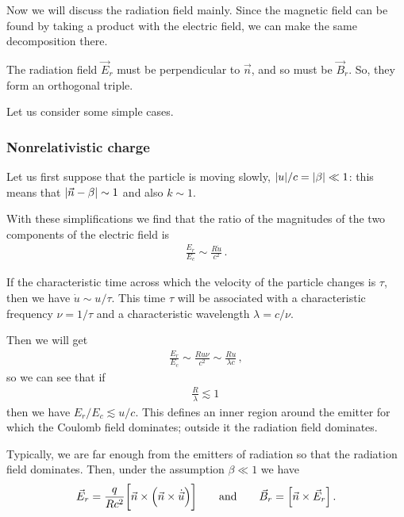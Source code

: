 \documentclass[main.tex]{subfiles}
\begin{document}
Now we will discuss the radiation field mainly. Since the magnetic field can be found by taking a product with the electric field, we can make the same decomposition there.

The radiation field \(\vec{E}_r\) must be perpendicular to \(\vec{n}\), and so must be \(\vec{B}_r\). So, they form an orthogonal triple. 

Let us consider some simple cases. 

\subsubsection{Nonrelativistic charge}

Let us first suppose that the particle is moving slowly, \(\abs{u}/ c = \abs{\beta } \ll 1 \): this means that \(\abs{\vec{n} - \beta } \sim 1\) and also \(k \sim 1\). 

With these simplifications we find that the ratio of the magnitudes of the two components of the electric field is  
%
\begin{align}
\frac{E_r}{E_c} \sim \frac{R \dot{u}}{c^2}
\,.
\end{align}

If the characteristic time across which the velocity of the particle changes is \(\tau \), then we have \(\dot{u} \sim u / \tau\). 
This time \(\tau \) will be associated with a characteristic frequency \(\nu = 1 / \tau \) and a characteristic wavelength \(\lambda = c / \nu \). 

Then we will get 
%
\begin{align}
\frac{E_r}{E_c} \sim \frac{R u \nu }{c^2} \sim \frac{R u}{\lambda c}
\,,
\end{align}
%
so we can see that if 
%
\begin{align}
\frac{R}{\lambda } \lesssim 1
\,
\end{align}
%
then we have \(E_r / E_c \lesssim u /c\). This defines an inner region around the emitter for which the Coulomb field dominates; outside it the radiation field dominates. 

Typically, we are far enough from the emitters of radiation so that the radiation field dominates. 
Then, under the assumption \(\beta \ll 1\) we have  
%
\begin{align}
\vec{E}_r = \frac{q}{Rc^2} \qty[\vec{n} \times \qty(\vec{n} \times \dot{\vec{u}})]
\qquad \text{and} \qquad
\vec{B}_r = \qty[\vec{n} \times \vec{E}_r]
\,.
\end{align}
\end{document}
